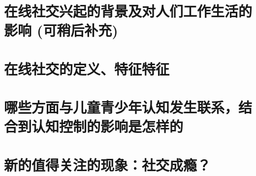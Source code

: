 \section{ 在线社交兴起的背景及对人们工作生活的影响 (可稍后补充)}
\section{在线社交的定义、特征特征}
\section{哪些方面与儿童青少年认知发生联系，结合到认知控制的影响是怎样的}
\section{新的值得关注的现象：社交成瘾？}
